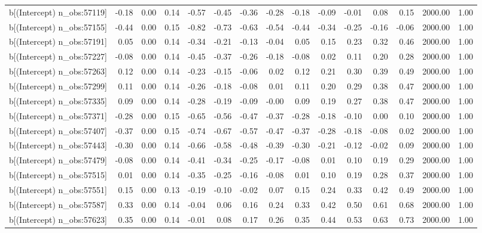 \begin{table}[ht]
\begin{tabular}{rrrrrrrrrrrrrrr}
  b[(Intercept) n\_obs:57119] & -0.18 & 0.00 & 0.14 & -0.57 & -0.45 & -0.36 & -0.28 & -0.18 & -0.09 & -0.01 & 0.08 & 0.15 & 2000.00 & 1.00 \\ 
  b[(Intercept) n\_obs:57155] & -0.44 & 0.00 & 0.15 & -0.82 & -0.73 & -0.63 & -0.54 & -0.44 & -0.34 & -0.25 & -0.16 & -0.06 & 2000.00 & 1.00 \\ 
  b[(Intercept) n\_obs:57191] & 0.05 & 0.00 & 0.14 & -0.34 & -0.21 & -0.13 & -0.04 & 0.05 & 0.15 & 0.23 & 0.32 & 0.46 & 2000.00 & 1.00 \\ 
  b[(Intercept) n\_obs:57227] & -0.08 & 0.00 & 0.14 & -0.45 & -0.37 & -0.26 & -0.18 & -0.08 & 0.02 & 0.11 & 0.20 & 0.28 & 2000.00 & 1.00 \\ 
  b[(Intercept) n\_obs:57263] & 0.12 & 0.00 & 0.14 & -0.23 & -0.15 & -0.06 & 0.02 & 0.12 & 0.21 & 0.30 & 0.39 & 0.49 & 2000.00 & 1.00 \\ 
  b[(Intercept) n\_obs:57299] & 0.11 & 0.00 & 0.14 & -0.26 & -0.18 & -0.08 & 0.01 & 0.11 & 0.20 & 0.29 & 0.38 & 0.47 & 2000.00 & 1.00 \\ 
  b[(Intercept) n\_obs:57335] & 0.09 & 0.00 & 0.14 & -0.28 & -0.19 & -0.09 & -0.00 & 0.09 & 0.19 & 0.27 & 0.38 & 0.47 & 2000.00 & 1.00 \\ 
  b[(Intercept) n\_obs:57371] & -0.28 & 0.00 & 0.15 & -0.65 & -0.56 & -0.47 & -0.37 & -0.28 & -0.18 & -0.10 & 0.00 & 0.10 & 2000.00 & 1.00 \\ 
  b[(Intercept) n\_obs:57407] & -0.37 & 0.00 & 0.15 & -0.74 & -0.67 & -0.57 & -0.47 & -0.37 & -0.28 & -0.18 & -0.08 & 0.02 & 2000.00 & 1.00 \\ 
  b[(Intercept) n\_obs:57443] & -0.30 & 0.00 & 0.14 & -0.66 & -0.58 & -0.48 & -0.39 & -0.30 & -0.21 & -0.12 & -0.02 & 0.09 & 2000.00 & 1.00 \\ 
  b[(Intercept) n\_obs:57479] & -0.08 & 0.00 & 0.14 & -0.41 & -0.34 & -0.25 & -0.17 & -0.08 & 0.01 & 0.10 & 0.19 & 0.29 & 2000.00 & 1.00 \\ 
  b[(Intercept) n\_obs:57515] & 0.01 & 0.00 & 0.14 & -0.35 & -0.25 & -0.16 & -0.08 & 0.01 & 0.10 & 0.19 & 0.28 & 0.37 & 2000.00 & 1.00 \\ 
  b[(Intercept) n\_obs:57551] & 0.15 & 0.00 & 0.13 & -0.19 & -0.10 & -0.02 & 0.07 & 0.15 & 0.24 & 0.33 & 0.42 & 0.49 & 2000.00 & 1.00 \\ 
  b[(Intercept) n\_obs:57587] & 0.33 & 0.00 & 0.14 & -0.04 & 0.06 & 0.16 & 0.24 & 0.33 & 0.42 & 0.50 & 0.61 & 0.68 & 2000.00 & 1.00 \\ 
  b[(Intercept) n\_obs:57623] & 0.35 & 0.00 & 0.14 & -0.01 & 0.08 & 0.17 & 0.26 & 0.35 & 0.44 & 0.53 & 0.63 & 0.73 & 2000.00 & 1.00 \\ 

\end{tabular}
\end{table}
